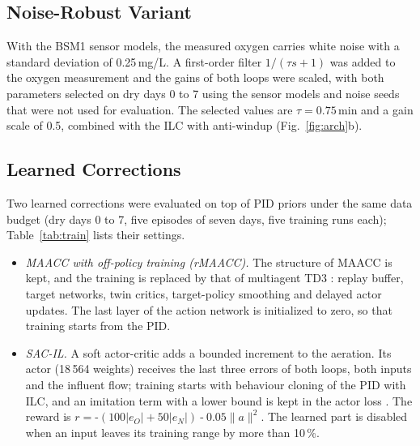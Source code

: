 \documentclass[journal]{IEEEtran}
\newcommand{\mn}{\mathbin{\text{-}}}
\begin{document}
\subsection{Noise-Robust Variant}
With the BSM1 sensor models, the measured oxygen carries white noise with a
standard deviation of 0.25\,mg/L. A first-order filter
$1/(\tau s+1)$ was added to the oxygen measurement and the gains of both
loops were scaled, with both parameters selected on dry days 0 to 7 using
the sensor models and noise seeds that were not used for evaluation. The
selected values are $\tau=0.75$\,min and a gain scale of 0.5, combined with
the ILC with anti-windup (Fig.~\ref{fig:arch}b).

\subsection{Learned Corrections}
Two learned corrections were evaluated on top of PID priors under the same
data budget (dry days 0 to 7, five episodes of seven days, five training
runs each); Table~\ref{tab:train} lists their settings.
\begin{itemize}
\item \emph{MAACC with off-policy training (rMAACC).} The structure of MAACC
  is kept, and the training is replaced by that of multiagent TD3
  \cite{fujimoto2018td3,ackermann2019matd3}: replay buffer, target networks,
  twin critics, target-policy smoothing and delayed actor updates. The last
  layer of the action network is initialized to zero, so that training
  starts from the PID.
\item \emph{SAC-IL.} A soft actor-critic \cite{haarnoja2018sac} adds a
  bounded increment to the aeration. Its actor (18\,564 weights) receives
  the last three errors of both loops, both inputs and the influent flow;
  training starts with behaviour cloning of the PID with ILC, and an
  imitation term with a lower bound is kept in the actor loss
  \cite{fujimoto2021td3bc}. The reward is
  $r=\mn (100|e_O|+50|e_N|)\mn 0.05\|a\|^2$. The learned part is disabled when an
  input leaves its training range by more than 10\,\%.
\end{itemize}
\end{document}
